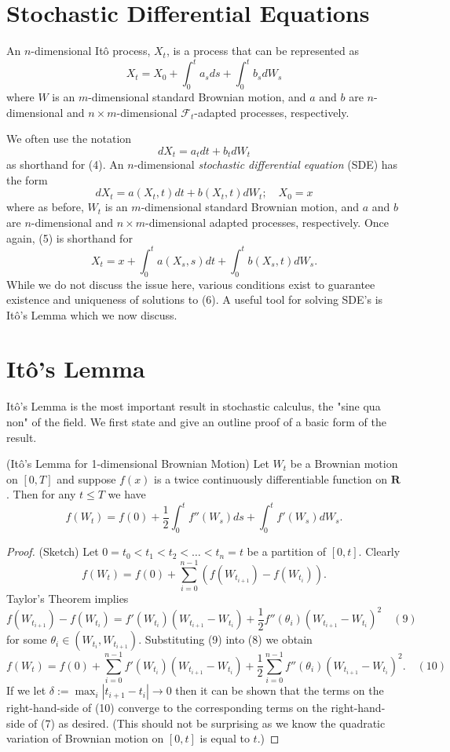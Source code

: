 \section{Stochastic Differential Equations}
\begin{definition}
An $n$-dimensional It\^o process, $X_t$, is a process that can be represented as
\[X_t = X_0 + \int_0^t a_s ds + \int_0^t b_s dW_s \tag{4}\]
where $W$ is an $m$-dimensional standard Brownian motion, and $a$ and $b$ are $n$-dimensional and $n\times m$-dimensional $\mathcal{F}_t$-adapted processes, respectively.
\end{definition}
We often use the notation
\[dX_t = a_t dt + b_t dW_t\]
as shorthand for (4). An $n$-dimensional \textit{stochastic differential equation} (SDE) has the form
\[dX_t = a(X_t,t) dt + b(X_t,t) dW_t; \quad X_0=x \tag{5}\]
where as before, $W_t$ is an $m$-dimensional standard Brownian motion, and $a$ and $b$ are $n$-dimensional and $n\times m$-dimensional adapted processes, respectively. Once again, (5) is shorthand for
\[X_t = x + \int_0^t a(X_s,s) dt + \int_0^t b(X_s,t) dW_s. \tag{6}\]
While we do not discuss the issue here, various conditions exist to guarantee existence and uniqueness of solutions to (6). A useful tool for solving SDE's is It\^o's Lemma which we now discuss.

\section{It\^o's Lemma}
It\^o's Lemma is the most important result in stochastic calculus, the "sine qua non" of the field. We first state and give an outline proof of a basic form of the result.

\begin{theorem} (It\^o's Lemma for 1-dimensional Brownian Motion)
Let $W_t$ be a Brownian motion on $[0,T]$ and suppose $f(x)$ is a twice continuously differentiable function on $\mathbf{R}$. Then for any $t\leq T$ we have
\[f(W_t) = f(0) + \frac{1}{2} \int_0^t f''(W_s) ds + \int_0^t f'(W_s) dW_s. \tag{7}\]
\end{theorem}

\begin{proof} (Sketch)
Let $0=t_0<t_1<t_2<\ldots<t_n=t$ be a partition of $[0,t]$. Clearly
\[f(W_t) = f(0) + \sum_{i=0}^{n-1} (f(W_{t_{i+1}})-f(W_{t_i})). \tag{8}\]
Taylor's Theorem implies
\[f(W_{t_{i+1}})-f(W_{t_i}) = f'(W_{t_i})(W_{t_{i+1}}-W_{t_i}) + \frac{1}{2}f''(\theta_i)(W_{t_{i+1}}-W_{t_i})^2 \quad(9)\]
for some $\theta_i\in(W_{t_i},W_{t_{i+1}})$. Substituting (9) into (8) we obtain
\[f(W_t) = f(0) + \sum_{i=0}^{n-1} f'(W_{t_i})(W_{t_{i+1}}-W_{t_i}) + \frac{1}{2}\sum_{i=0}^{n-1} f''(\theta_i)(W_{t_{i+1}}-W_{t_i})^2. \quad(10)\]
If we let $\delta:=\max_i|t_{i+1}-t_i|\to 0$ then it can be shown that the terms on the right-hand-side of (10) converge to the corresponding terms on the right-hand-side of (7) as desired. (This should not be surprising as we know the quadratic variation of Brownian motion on $[0,t]$ is equal to $t$.)
\end{proof}

